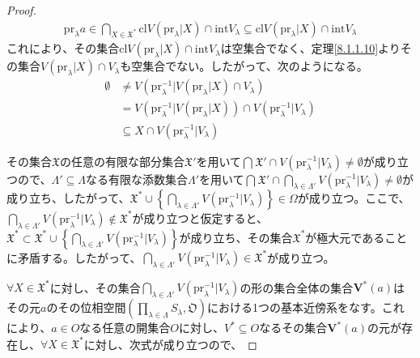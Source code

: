 \documentclass[dvipdfmx]{jsarticle}
\begin{document}
\begin{proof}
\begin{align*}
{\mathrm{pr}}_{\lambda}a \in \bigcap_{X \in \mathfrak{X}^{*}} {{\mathrm{cl}}{V\left( {\mathrm{pr}}_{\lambda}|X \right)}} \cap {\mathrm{int}}V_{\lambda} \subseteq {\mathrm{cl}}{V\left( {\mathrm{pr}}_{\lambda}|X \right)} \cap {\mathrm{int}}V_{\lambda}
\end{align*}
これにより、その集合${\mathrm{cl}}{V\left( {\mathrm{pr}}_{\lambda}|X \right)} \cap {\mathrm{int}}V_{\lambda}$は空集合でなく、定理\ref{8.1.1.10}よりその集合$V\left( {\mathrm{pr}}_{\lambda}|X \right) \cap V_{\lambda}$も空集合でない。したがって、次のようになる。
\begin{align*}
\emptyset &\neq V\left( {\mathrm{pr}}_{\lambda}^{- 1}|V\left( {\mathrm{pr}}_{\lambda}|X \right) \cap V_{\lambda} \right)\\
&= V\left( {\mathrm{pr}}_{\lambda}^{- 1}|V\left( {\mathrm{pr}}_{\lambda}|X \right) \right) \cap V\left( {\mathrm{pr}}_{\lambda}^{- 1}|V_{\lambda} \right)\\
&\subseteq X \cap V\left( {\mathrm{pr}}_{\lambda}^{- 1}|V_{\lambda} \right)
\end{align*}\par
その集合$\mathfrak{X}$の任意の有限な部分集合$\mathfrak{X}'$を用いて$\bigcap_{} \mathfrak{X}' \cap V\left( {\mathrm{pr}}_{\lambda}^{- 1}|V_{\lambda} \right) \neq \emptyset$が成り立つので、$\varLambda' \subseteq \varLambda$なる有限な添数集合$\varLambda'$を用いて$\bigcap_{} \mathfrak{X}' \cap \bigcap_{\lambda \in \varLambda' } {V\left( {\mathrm{pr}}_{\lambda}^{- 1}|V_{\lambda} \right)} \neq \emptyset$が成り立ち、したがって、$\mathfrak{X}^{*} \cup \left\{ \bigcap_{\lambda \in \varLambda' } {V\left( {\mathrm{pr}}_{\lambda}^{- 1}|V_{\lambda} \right)} \right\} \in \varOmega$が成り立つ。ここで、$\bigcap_{\lambda \in \varLambda' } {V\left( {\mathrm{pr}}_{\lambda}^{- 1}|V_{\lambda} \right)} \notin \mathfrak{X}^{*}$が成り立つと仮定すると、$\mathfrak{X}^{*} \subset \mathfrak{X}^{*} \cup \left\{ \bigcap_{\lambda \in \varLambda' } {V\left( {\mathrm{pr}}_{\lambda}^{- 1}|V_{\lambda} \right)} \right\}$が成り立ち、その集合$\mathfrak{X}^{*}$が極大元であることに矛盾する。したがって、$\bigcap_{\lambda \in \varLambda' } {V\left( {\mathrm{pr}}_{\lambda}^{- 1}|V_{\lambda} \right)} \in \mathfrak{X}^{*}$が成り立つ。\par
$\forall X \in \mathfrak{X}^{*}$に対し、その集合$\bigcap_{\lambda \in \varLambda' } {V\left( {\mathrm{pr}}_{\lambda}^{- 1}|V_{\lambda} \right)}$の形の集合全体の集合$\mathbf{V}^{*}(a)$はその元$a$のその位相空間$\left( \prod_{\lambda \in \varLambda} S_{\lambda},\mathfrak{O} \right)$における1つの基本近傍系をなす。これにより、$a \in O$なる任意の開集合$O$に対し、$V^{*} \subseteq O$なるその集合$\mathbf{V}^{*}(a)$の元が存在し、$\forall X \in \mathfrak{X}^{*}$に対し、次式が成り立つので、

\end{proof}
\end{document}
